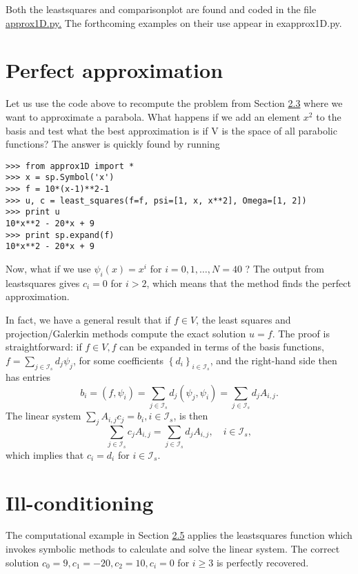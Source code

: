 \documentclass[../main.tex]{subfiles}
\begin{document}
Both the least\textunderscore squares and comparison\textunderscore plot are found and coded in the
file \href{http://tinyurl.com/jvzzcfn/fem/approx1D.py}{approx1D.py.} The forthcoming examples on their use appear in ex\textunderscore approx1D.py.
\section[Perfect approximation]{Perfect approximation}
\label{sec:sec_2_5}
Let us use the code above to recompute the problem from Section \hyperref[sec:sec_2_3]{2.3} where we want to approximate a parabola. What happens if we add an element $x^{2}$ to the basis and test what the best approximation is if V is the space of all parabolic
functions? The answer is quickly found by running
\begin{lstlisting}[numbers=none]
>>> from approx1D import *
>>> x = sp.Symbol('x')
>>> f = 10*(x-1)**2-1
>>> u, c = least_squares(f=f, psi=[1, x, x**2], Omega=[1, 2])
>>> print u
10*x**2 - 20*x + 9
>>> print sp.expand(f)
10*x**2 - 20*x + 9
\end{lstlisting}
Now, what if we use $\psi_{i}(x)=x^{i}$ for $i=0,1, \ldots, N=40$ ? The output from least\textunderscore squares gives $c_{i}=0$ for $i>2$, which means that the method finds the perfect approximation.

In fact, we have a general result that if $f \in V$, the least squares and projection/Galerkin methods compute the exact solution $u=f$. The proof is straightforward: if $f \in V, f$ can be expanded in terms of the basis functions, $f=\sum_{j \in \mathcal{I}_{s}} d_{j} \psi_{j}$, for some coefficients $\left\{d_{i}\right\}_{i \in \mathcal{I}_{s}}$, and the right-hand side then has entries
$$
b_{i}=\left(f, \psi_{i}\right)=\sum_{j \in \mathcal{I}_{s}} d_{j}\left(\psi_{j}, \psi_{i}\right)=\sum_{j \in \mathcal{I}_{s}} d_{j} A_{i, j}.
$$
The linear system $\sum_{j} A_{i, j} c_{j}=b_{i}, i \in \mathcal{I}_{s}$, is then
$$
\sum_{j \in \mathcal{I}_{s}} c_{j} A_{i, j}=\sum_{j \in \mathcal{I}_{s}} d_{j} A_{i, j}, \quad i \in \mathcal{I}_{s},
$$
which implies that $c_{i}=d_{i}$ for $i \in \mathcal{I}_{s}$.
\section[Ill-conditioning]{Ill-conditioning}
\label{sec:sec_2_6}
The computational example in Section \hyperref[sec:sec_2_5]{2.5} applies the least\textunderscore squares function which invokes symbolic methods to calculate and solve the linear system. The correct solution $c_{0}=9, c_{1}=-20, c_{2}=10, c_{i}=0$ for $i \geq 3$ is perfectly recovered.
\end{document}
